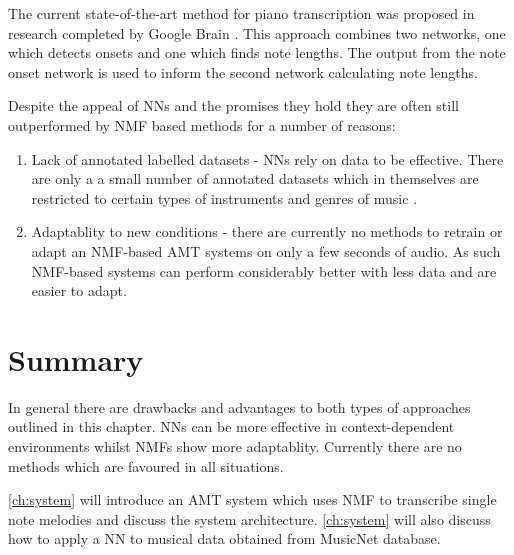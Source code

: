 The current state-of-the-art method for piano transcription was proposed in
research completed by Google Brain \cite{google2018:Elsen}. This approach
combines two networks, one which detects onsets and one which finds note
lengths. The output from the note onset network is used to inform the second
network calculating note lengths.

Despite the appeal of NNs and the promises they hold they are often still
outperformed by \ac{NMF} based methods for a number of reasons:
\begin{enumerate}
  \item Lack of annotated labelled datasets - \ac{NN}s rely on data to be
        effective. There are only a a small number of annotated datasets which
        in themselves are restricted to certain types of instruments and genres
        of music \cite{ground-truths:Su}.
  \item Adaptablity to new conditions - there are currently no methods to
        retrain or adapt an \ac{NMF}-based \ac{AMT} systems on only a few seconds of audio.
        As such \ac{NMF}-based systems can perform considerably better with less data
        and are easier to adapt.
\end{enumerate}

\section{Summary}

In general there are drawbacks and advantages to both types of approaches
outlined in this chapter. \ac{NN}s can be more effective in context-dependent
environments whilst \ac{NMF}s show more adaptablity. Currently there are no methods
which are favoured in all situations.

\autoref{ch:system} will introduce an \ac{AMT} system which uses \ac{NMF} to transcribe
single note melodies and discuss the system architecture. \autoref{ch:system}
will also discuss how to apply a \ac{NN} to musical data obtained from
\citeyear{thickstun2018invariances} MusicNet database.
